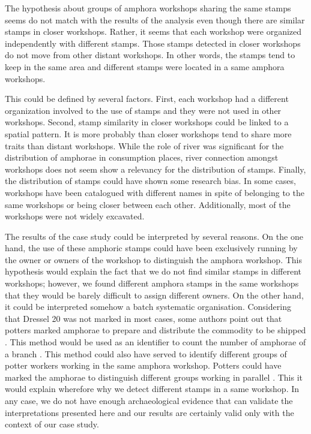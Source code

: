 \documentclass[review]{elsarticle}
\begin{document}
The hypothesis about groups of amphora workshops sharing the same stamps seems do not match with the results of the analysis even though there are similar stamps in closer workshops. Rather, it seems that each workshop were organized independently with different stamps. Those stamps detected in closer workshops do not move from other distant workshops. In other words, the stamps tend to keep in the same area and different stamps were located in a same amphora workshops. 

This could be defined by several factors. First, each workshop had a different organization involved to the use of stamps and they were not used in other workshops. Second, stamp similarity in closer workshops could be linked to a spatial pattern. It is more probably than closer workshops tend to share more traits than distant workshops. While the role of river was significant for the distribution of amphorae in consumption places, river connection amongst workshops does not seem show a relevancy for the distribution of stamps. Finally, the distribution of stamps could have shown some research bias. In some cases, workshops have been catalogued with different names in spite of belonging to the same workshops or being closer between each other. Additionally, most of the workshops were not widely excavated. 


The results of the case study could be interpreted by several reasons. On the one hand, the use of these amphoric stamps could have been exclusively running by the owner or owners of the workshop to distinguish the amphora workshop. This hypothesis would explain the fact that we do not find similar stamps in different workshops; however, we found different amphora stamps in the same workshops that they would be barely difficult to assign different owners. On the other hand, it could be interpreted somehow a batch systematic organisation. Considering that Dressel 20 was not marked in most cases, some authors point out that potters marked amphorae to prepare and distribute the commodity to be shipped \citep{berni_millet_epigrafianforica_2008}. This method would be used as an identifier to count the number of amphorae of a branch \citep{juanmorostesis}. This method could also have served to identify different groups of potter workers working in the same amphora workshop. Potters could have marked the amphorae to distinguish different groups working in parallel \citep{li_crossbows_2014}. This it would explain wherefore why we detect different stamps in a same workshop. 
In any case, we do not have enough archaeological evidence that can validate the interpretations presented here and our results are certainly valid only with the context of our case study. 
\end{document}
